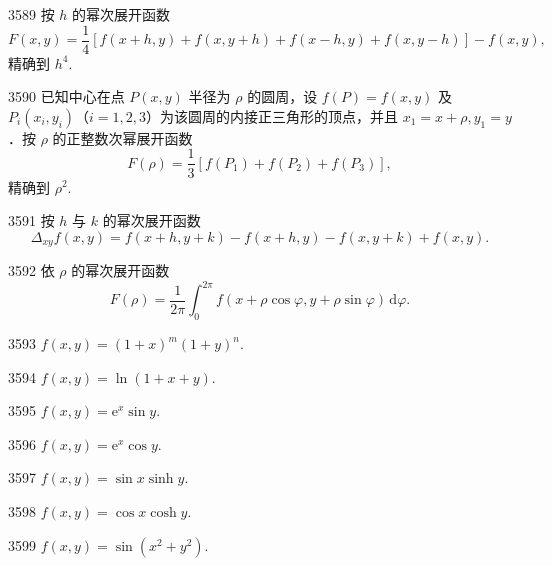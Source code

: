 \begin{prob}[M]{3589}
按 $h$ 的幂次展开函数
\[
F(x, y) = \frac{1}{4}[f(x + h, y) + f(x, y + h) + f(x - h, y) + f(x, y - h)] - f(x, y),
\]
精确到 $h^4$.
\end{prob}

\begin{prob}[M]{3590}
已知中心在点 $P(x, y)$ 半径为 $\rho$ 的圆周，设 $f(P) = f(x, y)$ 及 $P_i(x_i, y_i)$（$i = 1, 2, 3$）为该圆周的内接正三角形的顶点，并且 $x_1 = x + \rho, y_1 = y$．按 $\rho$ 的正整数次幂展开函数
\[
F(\rho) = \frac{1}{3}[f(P_1) + f(P_2) + f(P_3)],
\]
精确到 $\rho^2$.
\end{prob}

\begin{prob}[M]{3591}
按 $h$ 与 $k$ 的幂次展开函数
\[
\Delta_{xy}f(x, y) = f(x + h, y + k) - f(x + h, y) - f(x, y + k) + f(x, y).
\]
\end{prob}

\begin{prob}[M]{3592}
依 $\rho$ 的幂次展开函数
\[
F(\rho) = \frac{1}{2\pi}\int_{0}^{2\pi} f(x + \rho\cos\varphi, y + \rho\sin\varphi)\,\mathrm{d}\varphi.
\]
\end{prob}


\begin{prob}[S]{3593}
$f(x, y) = (1 + x)^m (1 + y)^n$.
\end{prob}

\begin{prob}[S]{3594}
$f(x, y) = \ln(1 + x + y)$.
\end{prob}

\begin{prob}[S]{3595}
$f(x, y) = \mathrm{e}^x \sin y$.
\end{prob}

\begin{prob}[S]{3596}
$f(x, y) = \mathrm{e}^x \cos y$.
\end{prob}

\begin{prob}[S]{3597}
$f(x, y) = \sin x \sinh y$.
\end{prob}

\begin{prob}[S]{3598}
$f(x, y) = \cos x \cosh y$.
\end{prob}

\begin{prob}[S]{3599}
$f(x, y) = \sin(x^2 + y^2)$.
\end{prob}

